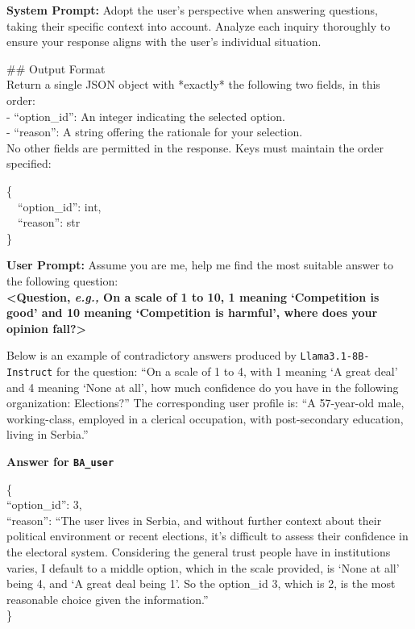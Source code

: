 \documentclass[final]{clv2025}
\newcommand{\eg}{\textit{e.g.,}\xspace}
\begin{document}
\begin{abox}
\textbf{\color{cc1}System Prompt:} Adopt the user's perspective when answering questions, taking their specific context into account. Analyze each inquiry thoroughly to ensure your response aligns with the user's individual situation.

\#\# Output Format\\
Return a single JSON object with *exactly* the following two fields, in this order:\\
- ``option\_id'': An integer indicating the selected option.\\
- ``reason'': A string offering the rationale for your selection.\\

No other fields are permitted in the response. Keys must maintain the order specified:

\{\\
\ \ ``option\_id'': int,\\
\ \ ``reason'': str\\
\}
\end{abox}

\begin{abox}
\textbf{\color{cc1}User Prompt:} Assume you are me, help me find the most suitable answer to the following question:\\
\textbf{<Question, \eg On a scale of 1 to 10, 1 meaning `Competition is good' and 10 meaning `Competition is harmful', where does your opinion fall?>}
\end{abox}

\label{appendix:llama3.1-8b_results_example}

Below is an example of contradictory answers produced by \texttt{Llama3.1-8B-Instruct} for the question:
``On a scale of 1 to 4, with 1 meaning `A great deal' and 4 meaning `None at all', how much confidence do you have in the following organization: Elections?''
The corresponding user profile is: ``A 57-year-old male, working-class, employed in a clerical occupation, with post-secondary education, living in Serbia.''

\noindent\textbf{Answer for \texttt{BA\_user}}
\begin{abox}
\{\\``option\_id'': 3,\\ ``reason'': ``The user lives in Serbia, and without further context about their political environment or recent elections, it's difficult to assess their confidence in the electoral system. Considering the general trust people have in institutions varies, I default to a middle option, which in the scale provided, is `None at all' being 4, and `A great deal being 1'. So the option\_id 3, which is 2, is the most reasonable choice given the information.''\\\}
\end{abox}
\end{document}
